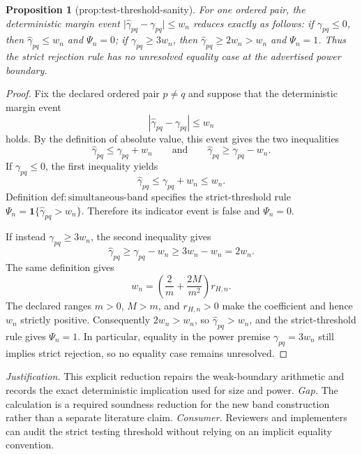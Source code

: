 \documentclass{article}
\newtheorem{proposition}{Proposition}
\begin{document}
\begin{proposition}[prop:test-threshold-sanity]\label{prop:test-threshold-sanity}
For one ordered pair, the deterministic margin event \(\lvert\widehat\gamma_{pq}-\gamma_{pq}\rvert\le w_n\) reduces exactly as follows: if \(\gamma_{pq}\le0\), then \(\widehat\gamma_{pq}\le w_n\) and \(\Psi_n=0\); if \(\gamma_{pq}\ge3w_n\), then \(\widehat\gamma_{pq}\ge2w_n>w_n\) and \(\Psi_n=1\). Thus the strict rejection rule has no unresolved equality case at the advertised power boundary.
\end{proposition}
\begin{proof}
Fix the declared ordered pair \(p\ne q\) and suppose that the deterministic margin event
\[
 \left\lvert\widehat\gamma_{pq}-\gamma_{pq}\right\rvert\le w_n
\]
holds. By the definition of absolute value, this event gives the two inequalities
\[
 \widehat\gamma_{pq}\le \gamma_{pq}+w_n
 \qquad\text{and}\qquad
 \widehat\gamma_{pq}\ge \gamma_{pq}-w_n.
\]
If \(\gamma_{pq}\le0\), the first inequality yields
\[
 \widehat\gamma_{pq}\le \gamma_{pq}+w_n\le w_n.
\]
Definition \(\mathrm{def:simultaneous\text{-}band}\) specifies the strict-threshold rule
\(\Psi_n=\mathbf 1\{\widehat\gamma_{pq}>w_n\}\). Therefore its indicator event is false and \(\Psi_n=0\).

If instead \(\gamma_{pq}\ge3w_n\), the second inequality gives
\[
 \widehat\gamma_{pq}
 \ge \gamma_{pq}-w_n
 \ge 3w_n-w_n
 =2w_n.
\]
The same definition gives
\[
 w_n=\left(\frac{2}{m}+\frac{2M}{m^2}\right)r_{H,n}.
\]
The declared ranges \(m>0\), \(M>m\), and \(r_{H,n}>0\) make the coefficient and hence \(w_n\) strictly positive. Consequently \(2w_n>w_n\), so \(\widehat\gamma_{pq}>w_n\), and the strict-threshold rule gives \(\Psi_n=1\). In particular, equality in the power premise \(\gamma_{pq}=3w_n\) still implies strict rejection, so no equality case remains unresolved.
\end{proof}
\par\smallskip\noindent \textit{Justification.} This explicit reduction repairs the weak-boundary arithmetic and records the exact deterministic implication used for size and power. \textit{Gap.} The calculation is a required soundness reduction for the new band construction rather than a separate literature claim. \textit{Consumer.} Reviewers and implementers can audit the strict testing threshold without relying on an implicit equality convention.
\end{document}
